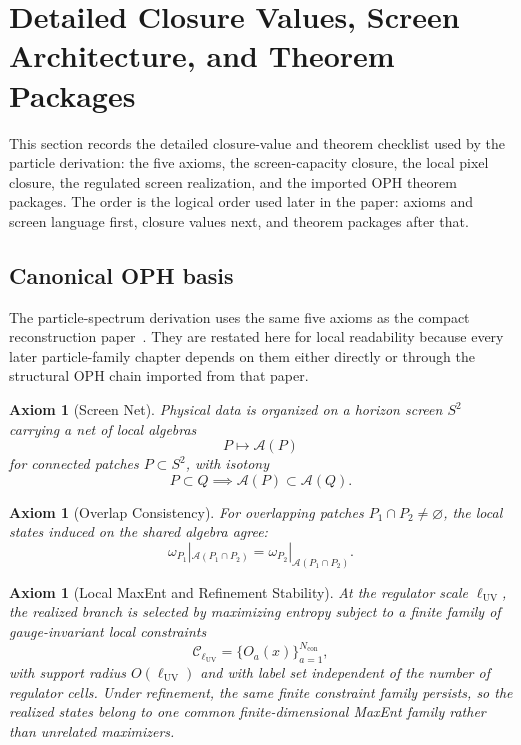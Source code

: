 \documentclass[11pt]{article}
\newtheorem{axiom}[theorem]{Axiom}
\begin{document}
\section{Detailed Closure Values, Screen Architecture, and Theorem Packages}\label{sec:particle-input-ledger}

This section records the detailed closure-value and theorem checklist used by the particle derivation: the five axioms,
the screen-capacity closure, the local pixel closure, the regulated screen realization, and the imported
OPH theorem packages. The order is the logical order used later in the paper: axioms and screen
language first, closure values next, and theorem packages after that.

\subsection{Canonical OPH basis}

The particle-spectrum derivation uses the same five axioms as the compact reconstruction
paper~\cite{ophcompact}. They are restated here for local readability because every later
particle-family chapter depends on them either directly or through the structural OPH chain
imported from that paper.

\begin{axiom}[Screen Net]\label{ax:screen}
Physical data is organized on a horizon screen \(S^2\) carrying a net of local algebras
\[
P \longmapsto \mathcal A(P)
\]
for connected patches \(P\subset S^2\), with isotony
\[
P\subset Q \implies \mathcal A(P)\subset \mathcal A(Q).
\]
\end{axiom}

\begin{axiom}[Overlap Consistency]\label{ax:overlap}
For overlapping patches \(P_1\cap P_2\neq\varnothing\), the local states induced on the shared
algebra agree:
\[
\omega_{P_1}|_{\mathcal A(P_1\cap P_2)}
=
\omega_{P_2}|_{\mathcal A(P_1\cap P_2)}.
\]
\end{axiom}

\begin{axiom}[Local MaxEnt and Refinement Stability]\label{ax:maxent}
At the regulator scale \(\ell_{\mathrm{UV}}\), the realized branch is selected by maximizing
entropy subject to a finite family of gauge-invariant local constraints
\[
\mathcal C_{\ell_{\mathrm{UV}}}=\{O_a(x)\}_{a=1}^{N_{\mathrm{con}}},
\]
with support radius \(O(\ell_{\mathrm{UV}})\) and with label set independent of the number of
regulator cells. Under refinement, the same finite constraint family persists, so the realized
states belong to one common finite-dimensional MaxEnt family rather than unrelated maximizers.
\end{axiom}
\end{document}
